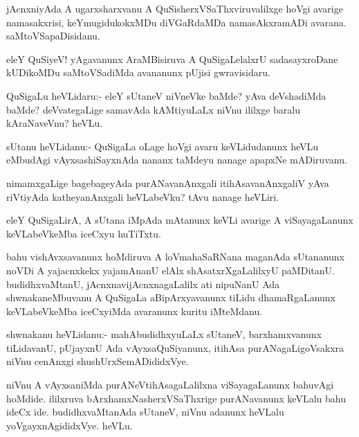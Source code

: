 \documentclass{article}
\begin{document}
\begin{mn}
jAcnxniyAda A ugarxsharxvanu A QuSisherxVSaThxviruvalilxge hoVgi
avarige namasakxrisi, keYmugidukokxMDu diVGaRdaMDa namasAkxramADi
avarana. saMtoVSapaDisidanu.
\end{mn}

\begin{mn}
eleY QuSiyeV! yAgavanunx AraMBisiruva A QuSigaLelalxrU sadasayxroDane
kUDikoMDu saMtoVSadiMda avananunx pUjisi gwravisidaru.
\end{mn}

\begin{mn}
QuSigaLu heVLidaru:- eleY sUtaneV niVneVke baMde? yAva deVshadiMda
baMde? deVvategaLige samavAda kAMtiyuLaLx niVnu ililxge baralu
kAraNaveVnu? heVLu.
\end{mn}

\begin{mn}
sUtanu heVLidanu:- QuSigaLa oLage hoVgi avaru keVLidudanunx heVLu
eMbudAgi vAyxsashiSayxnAda nananx taMdeyu nanage apapxNe mADiruvanu. 
\end{mn}

\begin{mn}
nimamxgaLige bagebageyAda purANavanAnxgali itihAsavanAnxgaliV yAva
riVtiyAda katheyanAnxgali heVLabeVku? tAvu nanage heVLiri.
\end{mn}

\begin{mn}
eleY QuSigaLirA, A sUtana iMpAda mAtanunx keVLi avarige A
viSayagaLanunx keVLabeVkeMba iceCxyu huTiTxtu.
\end{mn}

\begin{mn}
bahu vishAvxsavanunx hoMdiruva A loVmahaSaRNana maganAda sUtananunx
noVDi A yajacnxkekx yajamAnanU elAlx shAsatxrXgaLalilxyU
paMDitanU. budidhxvaMtanU, jAcnxnavijAcnxnagaLalilx ati nipuNanU Ada
shwnakaneMbuvanu A QuSigaLa aBipArxyavanunx tiLidu dhamaRgaLanunx
keVLabeVkeMba iceCxyiMda avaranunx kuritu iMteMdanu.
\end{mn}

\begin{mn}
shwnakanu heVLidanu:- mahAbudidhxyuLaLx sUtaneV, barxhamxvanunx
tiLidavanU, pUjayxnU Ada vAyxsaQuSiyanunx, itihAsa purANagaLigoVsakxra
niVnu cenAnxgi shushUrxSemADididxVye.
\end{mn}

\begin{mn}
niVnu A vAyxsaniMda purANeVtihAsagaLalilxna viSayagaLanunx bahuvAgi
hoMdide. ililxruva bArxhamxNasherxVSaThxrige purANavanunx keVLalu bahu
ideCx ide. budidhxvaMtanAda sUtaneV, niVnu adanunx heVLalu
yoVgayxnAgididxVye. heVLu.
\end{mn}
\end{document}

